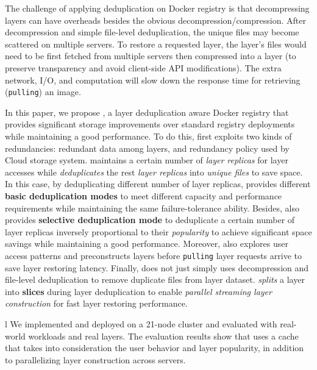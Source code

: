 %
%
The challenge of applying deduplication on Docker registry is that
decompressing layers can have overheads besides the obvious
decompression/compression. 
%
After decompression and simple file-level deduplication, the unique files may
become scattered on multiple servers.
%
To restore a requested layer, the
layer's files would need to be first fetched from multiple servers then
compressed into a layer (to preserve transparency and avoid client-side API
modifications).
%
%
The extra network, I/O, and computation will slow down the response time for
retrieving (\texttt{pulling}) an image.

%
%
%
%
In this paper, we propose \sysname, a layer deduplication aware Docker registry
that provides significant storage improvements over standard registry
deployments while maintaining a good performance.
%
To do this, \sysname first
exploits two kinds of redundancies: redundant data among layers, and redundancy
policy used by Cloud storage system.
%
\sysname maintains a certain number of
\emph{layer replicas} for layer accesses while \emph{deduplicates} the rest
\emph{layer replicas} into \emph{unique files} to save space.
%
In this case, by
deduplicating different number of layer replicas, \sysname provides different
\textbf{basic deduplication modes} to meet different capacity and performance
requirements while maintaining the same failure-tolerance ability.
%
Besides,
\sysname also provides \textbf{selective deduplication mode} to deduplicate a
certain number of layer replicas inversely proportional to their
\emph{popularity} to achieve significant space savings while maintaining a good
performance.
%
Moreover, \sysname also explores user access patterns and
preconstructs layers before \texttt{pulling} layer requests arrive to save
layer restoring latency.
%
Finally, \sysname does not just simply uses
decompression and file-level deduplication to remove duplicate files from layer
dataset.
%
\sysname \emph{splits} a layer into \textbf{slices} during layer
deduplication to enable \emph{parallel streaming layer construction} for fast
layer restoring performance.


%
%
l
%
We implemented and deployed \sysname on a 21-node cluster and evaluated with
real-world workloads and real layers.
%
The evaluation results show that
uses a cache that takes into consideration the user behavior and layer
popularity, in addition to parallelizing layer construction across %
servers.

